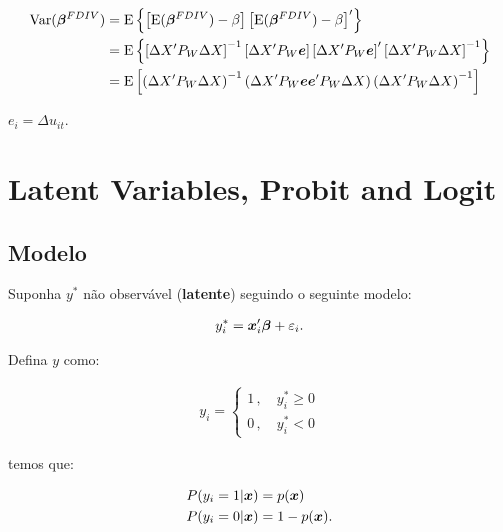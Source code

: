 \documentclass[11pt, oneside, a4paper, article]{article}
\numberwithin{equation}{section}
\begin{document}
\begin{description}
\vspace{-1 em}
\begin{align*}
\text{Var}( \boldsymbol{\beta}^{FDIV} ) &=
\text{E}\left\{  
\left[ \text{E}( \boldsymbol{\beta}^{FDIV} ) - \beta \right] 
\left[ \text{E}( \boldsymbol{\beta}^{FDIV} ) - \beta \right]'
\right\}
\\
&=
\text{E}\left\{  
\left[ \Delta X' P_{W} \Delta X \right]^{-1}
\left[ \Delta X' P_{W} \boldsymbol{e} \right]
\left[ \Delta X' P_{W} \boldsymbol{e} \right]'
\left[ \Delta X' P_{W} \Delta X \right]^{-1}
\right\}
\\
&=
\text{E}\left[
\left( \Delta X' P_{W} \Delta X \right)^{-1}
\left( \Delta X' P_{W} \boldsymbol{e} \boldsymbol{e}' P_{W} \Delta X \right)
\left( \Delta X' P_{W} \Delta X \right)^{-1}
\right]
\end{align*}

\noindent
$e_{i} = \Delta u_{it}$.

\clearpage
\section{Latent Variables, Probit and Logit}

\subsection{Modelo}

Suponha $y^{*}$ não observável (\textbf{latente}) seguindo o seguinte modelo:

\vspace{-1 em}
\begin{align} \label{mod1:probit}
	y_{i}^{*} = \boldsymbol{x}_{i}' \boldsymbol{\beta} + \varepsilon_{i}.
\end{align}

\noindent
Defina $y$ como:

\vspace{-1 em}
\begin{align*}
y_{i} =
\begin{cases}
	1 \, , \quad y^{*}_{i} \geq 0
\\
	0 \, , \quad y^{*}_{i} < 0
\end{cases}
\end{align*}

\noindent
temos que:

\vspace{-1 em}
\begin{align*}
	P( y_{i} = 1 | \boldsymbol{x} ) &= p( \boldsymbol{x} )
	\\
	P( y_{i} = 0 | \boldsymbol{x} ) &= 1 - p( \boldsymbol{x} ).
\end{align*}


\end{description}
\end{document}
